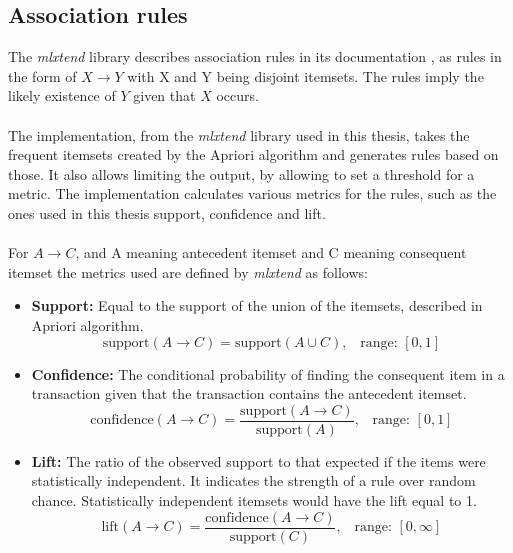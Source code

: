 \subsection{Association rules}
The \textit{mlxtend} library describes association rules in its documentation \parencite{Associat99:online}, as rules in the form of $X \rightarrow Y$ with X and Y being disjoint itemsets. The rules imply the likely existence of $Y$ given that $X$ occurs.
\\\\
The implementation, from the \textit{mlxtend} library \parencite{Associat99:online} used in this thesis, takes the frequent itemsets created by the Apriori algorithm and generates rules based on those. It also allows limiting the output, by allowing to set a threshold for a metric. The implementation calculates various metrics for the rules, such as the ones used in this thesis support, confidence and lift.
\\\\
For $A \rightarrow C$, and A meaning antecedent itemset and C meaning consequent itemset the metrics used are defined by \textit{mlxtend} \parencite{Associat99:online} as follows: 
\begin{itemize}
    \item \textbf{Support:} Equal to the support of the union of the itemsets, described in Apriori algorithm.\\
    \begin{equation}
    \text{support}(A\rightarrow C) = \text{support}(A \cup C), \;\;\; \text{range: } [0, 1]
    \end{equation}
    
    \item \textbf{Confidence:} The conditional probability of finding the consequent item in a transaction given that the transaction contains the antecedent itemset.\\
    \begin{equation}
    \text{confidence}(A\rightarrow C) = \frac{\text{support}(A\rightarrow C)}{\text{support}(A)}, \;\;\; \text{range: } [0, 1]
    \end{equation}
    
    \item \textbf{Lift:} The ratio of the observed support to that expected if the items were statistically independent. It indicates the strength of a rule over random chance. Statistically independent itemsets would have the lift equal to 1. \\
    \begin{equation}
    \text{lift}(A\rightarrow C) = \frac{\text{confidence}(A\rightarrow C)}{\text{support}(C)}, \;\;\; \text{range: } [0, \infty]
    \end{equation}
\end{itemize}

